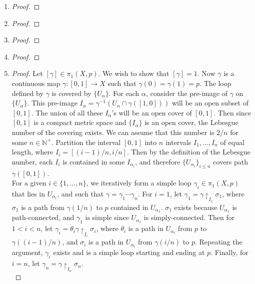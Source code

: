 \documentclass{article}
\begin{document}
\begin{enumerate}
    \item
    \begin{proof}
    \end{proof}

    \item
    \begin{proof}
    \end{proof}

    \item
    \begin{proof}
    \end{proof}

    \item
    \begin{proof}
    \end{proof}

    \item
    \begin{proof}
      Let $[\gamma]\in\pi_1(X,p)$. We wish to show that $[\gamma]=1$. Now
      $\gamma$ is a continuous map $\gamma:[0,1]\rightarrow X$ such that
      $\gamma(0)=\gamma(1)=p$. The loop defined by $\gamma$ is covered by
      $\{U_\alpha\}$. For each $\alpha$, consider the pre-image of $\gamma$
      on $\{U_\alpha\}$. This pre-image $I_\alpha=\gamma^{-1}(U_\alpha\cap
      \gamma([1,0]))$ will be an open subset of $[0,1]$. The union of all
      these $I_\alpha$'s will be an open cover of $[0,1]$. Then since
      $[0,1]$ is a compact metric space and $\{I_\alpha\}$ is an open
      cover, the Lebesgue number of the covering exists. We can assume that
      this number is $2/n$ for some $n\in\mathbb{N}^+$. Partition the
      interval $[0,1]$ into $n$ intervals $I_1,\ldots,I_n$ of equal length,
      where $I_i=[(i-1)/n,i/n]$. Then by the definition of the Lebesgue
      number, each $I_i$ is contained in some $I_{\alpha_i}$, and therefore
      $\{U_{\alpha_i}\}_{i\leq n}$ covers path $\gamma([0,1])$. \\

      For a given $i\in\{1,\ldots,n\}$, we iteratively form a simple loop
      $\gamma_i\in\pi_1(X,p)$ that lies in $U_{\alpha_i}$, and such that
      $\gamma=\gamma_1\cdots\gamma_n$. For $i=1$, let
      $\gamma_1=\gamma\upharpoonright_{I_1}\sigma_1$, where $\sigma_1$ is a
      path from $\gamma(1/n)$ to $p$ contained in $U_{\alpha_1}$.
      $\sigma_1$ exists because $U_{\alpha_1}$ is path-connected, and
      $\gamma_1$ is simple since $U_{\alpha_1}$ is simply-connected. Then
      for $1<i<n$, let
      $\gamma_i=\theta_i\gamma\upharpoonright_{I_i}\sigma_i$, where
      $\theta_i$ is a path in $U_{\alpha_i}$ from $p$ to
      $\gamma((i-1)/n)$, and $\sigma_i$ is a path in $U_{\alpha_i}$ from
      $\gamma(i/n)$ to $p$. Repeating the argument, $\gamma_i$ exists
      and is a simple loop starting and ending at $p$. Finally, for
      $i=n$, let $\gamma_n=\gamma\upharpoonright_{I_n}\sigma_n$. \\


\end{proof}
\end{enumerate}
\end{document}
